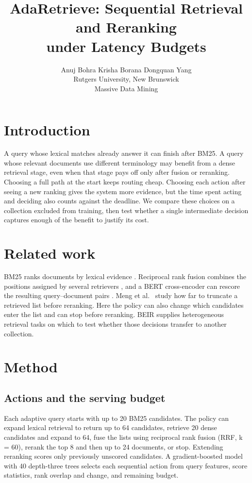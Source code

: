 \documentclass{article}
\title{AdaRetrieve: Sequential Retrieval and Reranking\\under Latency Budgets}
\author{Anuj Bohra \qquad Krisha Borana \qquad Dongquan Yang\\Rutgers University, New Brunswick\\Massive Data Mining}
\begin{document}
\maketitle
\begin{abstract}

\end{abstract}

\section{Introduction}
A query whose lexical matches already answer it can finish after BM25. A query whose relevant documents use different terminology may benefit from a dense retrieval stage, even when that stage pays off only after fusion or reranking. Choosing a full path at the start keeps routing cheap. Choosing each action after seeing a new ranking gives the system more evidence, but the time spent acting and deciding also counts against the deadline. We compare these choices on a collection excluded from training, then test whether a single intermediate decision captures enough of the benefit to justify its cost.

\section{Related work}
BM25 ranks documents by lexical evidence \cite{bm25}. Reciprocal rank fusion combines the positions assigned by several retrievers \cite{rrf}, and a BERT cross-encoder can rescore the resulting query--document pairs \cite{bert}. Meng et al.\ \cite{trunc} study how far to truncate a retrieved list before reranking. Here the policy can also change which candidates enter the list and can stop before reranking. BEIR \cite{beir} supplies heterogeneous retrieval tasks on which to test whether those decisions transfer to another collection.

\section{Method}
\subsection{Actions and the serving budget}
Each adaptive query starts with up to 20 BM25 candidates. The policy can expand lexical retrieval to return up to 64 candidates, retrieve 20 dense candidates and expand to 64, fuse the lists using reciprocal rank fusion (RRF, k = 60), rerank the top 8 and then up to 24 documents, or stop. Extending reranking scores only previously unscored candidates. A gradient-boosted model with 40 depth-three trees selects each sequential action from query features, score statistics, rank overlap and change, and remaining budget.
\end{document}
